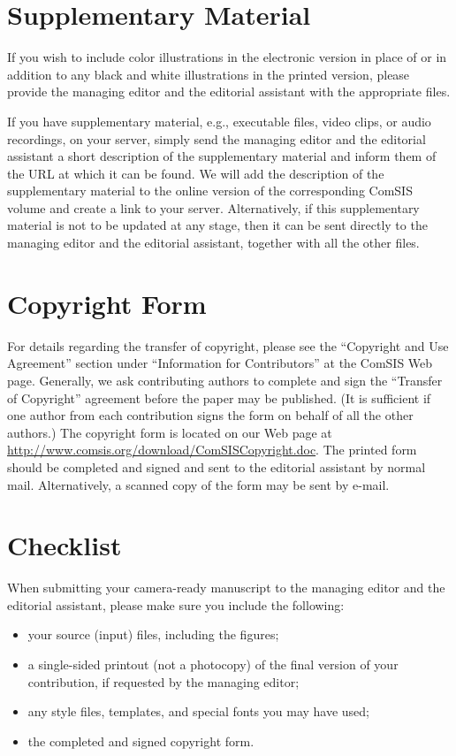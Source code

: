 \documentclass[runningheads]{comsis2}
\begin{document}
\section{Supplementary Material}

If you wish to include color illustrations in the electronic version in place
of or in addition to any black and white illustrations in the printed version,
please provide the managing editor and the editorial assistant with the
appropriate files.

If you have supplementary material, e.g., executable files, video clips, or
audio recordings, on your server, simply send the managing editor and the
editorial assistant a short description of the supplementary material and
inform them of the URL at which it can be found. We will add the description
of the supplementary material to the online version of the corresponding
ComSIS volume and create a link to your server. Alternatively, if this
supplementary material is not to be updated at any stage, then it can be sent
directly to the managing editor and the editorial assistant, together with all
the other files.


\section{Copyright Form}

For details regarding the transfer of copyright, please see the ``Copyright
and Use Agree\-ment'' section under ``Information for Contributors'' at the
ComSIS Web page. Generally, we ask contributing authors to complete and sign
the ``Transfer of Copyright'' agreement before the paper may be published.
(It is sufficient if one author from each contribution signs the form on
behalf of all the other authors.) The copyright form is located on our Web
page at \url{http://www.comsis.org/download/ComSISCopyright.doc}. The printed
form should be completed and signed and sent to the editorial assistant by
normal mail. Alternatively, a scanned copy of the form may be sent by e-mail.


\section{Checklist}

When submitting your camera-ready manuscript to the managing editor and the
editorial assistant, please make sure you include the following:
\begin{itemize}
  \item your source (input) files, including the figures;
  \item a single-sided printout (not a photocopy) of the final version of your contribution, if requested by the managing editor;
  \item any style files, templates, and special fonts you may have used;
  \item the completed and signed copyright form.
\end{itemize}
\end{document}
